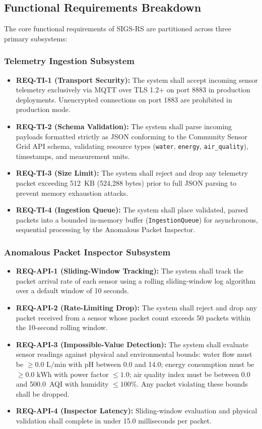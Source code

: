 \subsection{Functional Requirements Breakdown}
The core functional requirements of SIGS-RS are partitioned across three primary subsystems:

\subsubsection{Telemetry Ingestion Subsystem}
\begin{itemize}
    \item \textbf{REQ-TI-1 (Transport Security):} The system shall accept incoming sensor telemetry exclusively via MQTT over TLS 1.2+ on port 8883 in production deployments. Unencrypted connections on port 1883 are prohibited in production mode.
    \item \textbf{REQ-TI-2 (Schema Validation):} The system shall parse incoming payloads formatted strictly as JSON conforming to the Community Sensor Grid API schema, validating resource types (\texttt{water}, \texttt{energy}, \texttt{air\_quality}), timestamps, and measurement units.
    \item \textbf{REQ-TI-3 (Size Limit):} The system shall reject and drop any telemetry packet exceeding 512~KB (524,288 bytes) prior to full JSON parsing to prevent memory exhaustion attacks.
    \item \textbf{REQ-TI-4 (Ingestion Queue):} The system shall place validated, parsed packets into a bounded in-memory buffer (\texttt{IngestionQueue}) for asynchronous, sequential processing by the Anomalous Packet Inspector.
\end{itemize}

\subsubsection{Anomalous Packet Inspector Subsystem}
\begin{itemize}
    \item \textbf{REQ-API-1 (Sliding-Window Tracking):} The system shall track the packet arrival rate of each sensor using a rolling sliding-window log algorithm over a default window of 10 seconds.
    \item \textbf{REQ-API-2 (Rate-Limiting Drop):} The system shall reject and drop any packet received from a sensor whose packet count exceeds 50 packets within the 10-second rolling window.
    \item \textbf{REQ-API-3 (Impossible-Value Detection):} The system shall evaluate sensor readings against physical and environmental bounds: water flow must be $\ge 0.0\text{ L/min}$ with pH between 0.0 and 14.0; energy consumption must be $\ge 0.0\text{ kWh}$ with power factor $\le 1.0$; air quality index must be between 0.0 and 500.0~AQI with humidity $\le 100\%$. Any packet violating these bounds shall be dropped.
    \item \textbf{REQ-API-4 (Inspector Latency):} Sliding-window evaluation and physical validation shall complete in under 15.0 milliseconds per packet.
\end{itemize}


